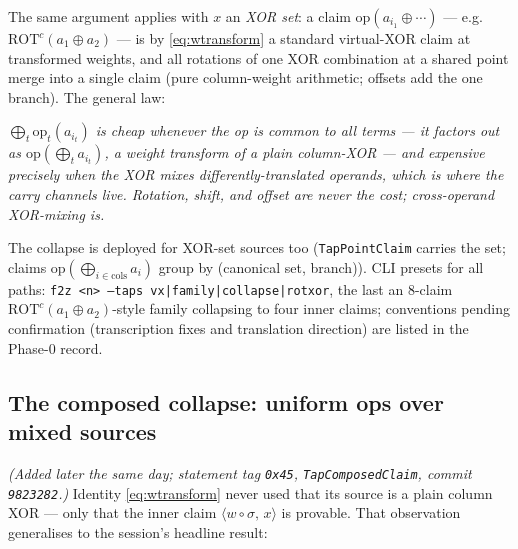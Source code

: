 \documentclass[11pt]{article}
\DeclareRobustCommand{\code}[1]{{\def\_{\textunderscore\allowbreak}\texttt{#1}}}
\theoremstyle{plain}
\theoremstyle{definition}
\theoremstyle{remark}
\begin{document}
The same argument applies with $x$ an \emph{XOR set}: a claim
$\mathrm{op}(a_{i_1}\oplus\cdots)$ --- e.g.\
$\mathrm{ROT}^{c}(a_1\oplus a_2)$ --- is by \eqref{eq:wtransform} a
standard virtual-XOR claim at transformed weights, and all rotations of
one XOR combination at a shared point merge into a single claim (pure
column-weight arithmetic; offsets add the one branch). The general law:
\begin{center}
\begin{minipage}{0.92\textwidth}\itshape
$\bigoplus_t \mathrm{op}_t(a_{i_t})$ is cheap whenever the op is common
to all terms --- it factors out as
$\mathrm{op}(\bigoplus_t a_{i_t})$, a weight transform of a plain
column-XOR --- and expensive precisely when the XOR mixes
differently-translated operands, which is where the carry channels
live. Rotation, shift, and offset are never the cost; cross-operand
XOR-mixing is.
\end{minipage}
\end{center}
The collapse is deployed for XOR-set sources too
(\code{TapPointClaim} carries the set; claims
$\mathrm{op}(\bigoplus_{i\in\mathrm{cols}}a_i)$ group by (canonical
set, branch)). CLI presets for all paths: \code{f2z <n> --taps
vx|family|collapse|rotxor}, the last an 8-claim
$\mathrm{ROT}^{c}(a_1\oplus a_2)$-style family collapsing to four
inner claims; conventions pending confirmation (transcription fixes
and translation direction) are listed in the Phase-0 record.

\subsection{The composed collapse: uniform ops over mixed sources}
\label{sec:tapcomposed}

\emph{(Added later the same day; statement tag \texttt{0x45},
\code{TapComposedClaim}, commit \texttt{9823282}.)} Identity
\eqref{eq:wtransform} never used that its source is a plain column
XOR --- only that the inner claim $\langle w\circ\sigma,\,x\rangle$
is provable. That observation generalises to the session's headline
result:
\end{document}
